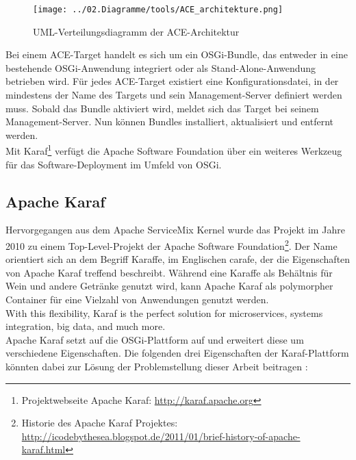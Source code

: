 \begin{figure}[h]
 \centering
 \texttt{[image: ../02.Diagramme/tools/ACE\_architekture.png]}
 \caption{UML-Verteilungsdiagramm der ACE-Architektur}
 \label{fig:ace_architecture}
\end{figure}

Bei einem ACE-Target handelt es sich um ein \ac{OSGi}-Bundle, das entweder in eine bestehende \ac{OSGi}-Anwendung integriert
oder als Stand-Alone-Anwendung betrieben wird. Für jedes ACE-Target existiert eine Konfigurationsdatei, in der mindestens
der Name des Targets und sein Management-Server definiert werden muss.
Sobald das Bundle aktiviert wird, meldet sich das Target bei seinem Management-Server.
Nun können Bundles installiert, aktualisiert und entfernt werden.\\

Mit Karaf\footnote{Projektwebseite Apache Karaf: \url{http://karaf.apache.org}} verfügt die Apache Software Foundation über ein weiteres Werkzeug für das Software-Deployment im Umfeld von \ac{OSGi}.

\subsection{Apache Karaf}
\label{Karaf_1}
Hervorgegangen aus dem Apache ServiceMix Kernel wurde das Projekt im Jahre 2010 zu einem Top-Level-Projekt der
Apache Software Foundation\footnote{Historie des Apache Karaf Projektes: \url{http://icodebythesea.blogspot.de/2011/01/brief-history-of-apache-karaf.html}}.
Der Name orientiert sich an dem Begriff Karaffe, im Englischen carafe, der die Eigenschaften von Apache Karaf treffend beschreibt.
Während eine Karaffe als Behältnis für Wein und andere Getränke genutzt wird, kann Apache Karaf als polymorpher Container für eine 
Vielzahl von Anwendungen genutzt werden.\\

\glqq With this flexibility, Karaf is the perfect solution for microservices, systems integration, big data, and much more. \grqq \cite{karaf}\\

Apache Karaf setzt auf die \ac{OSGi}-Plattform auf und erweitert diese um verschiedene Eigenschaften.
Die folgenden drei Eigenschaften der Karaf-Plattform könnten dabei zur Lösung der Problemstellung dieser Arbeit beitragen \cite{karaf}:

